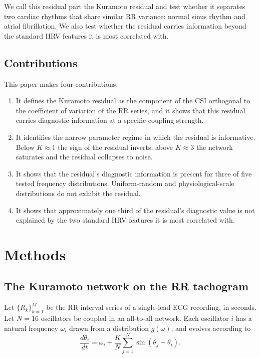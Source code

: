 \documentclass[11pt]{article}
\begin{document}
We call this residual part the Kuramoto residual and test whether it
separates two cardiac rhythms that share similar RR variance: normal
sinus rhythm and atrial fibrillation. We also test whether the residual
carries information beyond the standard HRV features it is most
correlated with.

\subsection{Contributions}

This paper makes four contributions.

\begin{enumerate}
\item It defines the Kuramoto residual as the component of the CSI
orthogonal to the coefficient of variation of the RR series, and it
shows that this residual carries diagnostic information at a specific
coupling strength.
\item It identifies the narrow parameter regime in which the residual is
informative. Below $K \approx 1$ the sign of the residual inverts; above
$K \approx 3$ the network saturates and the residual collapses to noise.
\item It shows that the residual's diagnostic information is present for
three of five tested frequency distributions. Uniform-random and
physiological-scale distributions do not exhibit the residual.
\item It shows that approximately one third of the residual's diagnostic
value is not explained by the two standard HRV features it is most
correlated with.
\end{enumerate}

\section{Methods}

\subsection{The Kuramoto network on the RR tachogram}

Let $\{R_k\}_{k=1}^{M}$ be the RR interval series of a single-lead ECG
recording, in seconds. Let $N = 16$ oscillators be coupled in an
all-to-all network. Each oscillator $i$ has a natural frequency
$\omega_i$ drawn from a distribution $g(\omega)$, and evolves according
to
\begin{equation}
\frac{d\theta_i}{dt} = \omega_i + \frac{K}{N}\sum_{j=1}^{N}
\sin(\theta_j - \theta_i).
\label{eq:kuramoto}
\end{equation}
\end{document}

